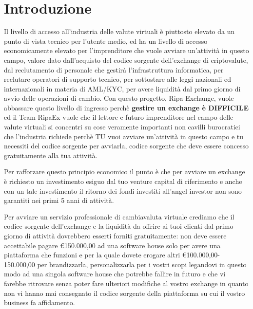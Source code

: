 
\chapter{Introduzione}
Il livello di accesso all'industria delle valute virtuali è piuttosto elevato da un punto di vista tecnico per l'utente medio, 
ed ha un livello di accesso economicamente elevato per l'imprenditore che vuole avviare un'attività in questo campo, valore dato 
dall'acquisto del codice sorgente dell'exchange di criptovalute, dal reclutamento di personale che gestirà l'infrastruttura informatica,
per reclutare operatori di supporto tecnico, per sottostare alle leggi nazionali ed internazionali in materia di AML/KYC, per avere liquidità
dal primo giorno di avvio delle operazioni di cambio. Con questo progetto, Ripa Exchange, vuole abbassare questo livello di ingresso 
perchè \textbf{gestire un exchange è DIFFICILE} ed il Team RipaEx vuole che il lettore e futuro imprenditore nel campo delle valute
virtuali si concentri su cose veramente importanti non cavilli burocratici che l'industria richiede perchè TU vuoi avviare un'attività
in questo campo e tu necessiti del codice sorgente per avviarla, codice sorgente che deve essere concesso gratuitamente alla tua attività.

Per rafforzare questo principio economico il punto è che per avviare un exchange è richiesto un investimento esiguo dal tuo 
venture capital di riferimento e anche con un tale investimento il ritorno dei fondi investiti all'angel investor non sono garantiti
nei primi 5 anni di attività.

Per avviare un servizio professionale di cambiavaluta virtuale crediamo che il codice sorgente dell'exchange e la liquidità da offrire ai tuoi clienti
dal primo giorno di attività dovrebbero esserti forniti gratuitamente: non deve essere accettabile pagare \euro150.000,00 ad una software house
solo per avere una piattaforma che funzioni e per la quale dovete erogare altri \euro100.000,00-150.000,00 per brandizzarla, personalizzarla
per i vostri scopi legandovi in questo modo ad una singola software house che potrebbe fallire in futuro e che vi farebbe ritrovare
senza poter fare ulteriori modifiche al vostro exchange in quanto non vi hanno mai consegnato il codice sorgente della piattaforma
su cui il vostro business fa affidamento.

